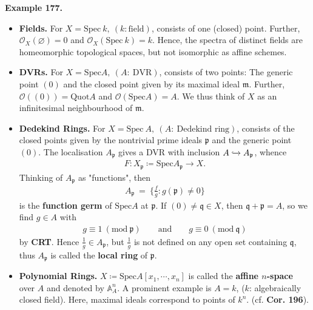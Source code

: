 \documentclass[12pt,a4paper,footinclude=true,headinclude=true]{scrbook} %
\newenvironment{example}[2][Example]
    { \begin{mdframed}[backgroundcolor=gray!20] \textbf{#1 #2.} }
    {  \end{mdframed}}
\begin{document}
\begin{example}{177}
    \begin{itemize}
        \item \textbf{Fields.} For $X=\mathrm{Spec}\ k,\ (k:\text{field})$, consists of one (closed) point. Further, $\mathcal{O}_X(\varnothing)=0$ and $\mathcal{O}_X(\mathrm{Spec}\ k)=k$. Hence, the spectra of distinct fields are homeomorphic topological spaces, but not isomorphic as affine schemes.
        \item \textbf{DVRs.} For $X=\mathrm{Spec}A,\ (A:\ \text{DVR})$, consists of two points: The generic point $(0)$ and the closed point given by its maximal ideal $\mathfrak{m}$. Further, $\mathcal{O}((0))=\mathrm{Quot}A$ and $\mathcal{O}(\mathrm{Spec}A)=A$. We thus think of $X$ as an infinitesimal neighbourhood of $\mathfrak{m}$.
        \item \textbf{Dedekind Rings.} For $X=\mathrm{Spec}\ A,\ (A:\ \text{Dedekind ring})$, consists of the closed points given by the nontrivial prime ideals $\mathfrak{p}$ and the generic point $(0)$. The localisation $A_\mathfrak{p}$ gives a DVR with inclusion $A\xhookrightarrow{} A_\mathfrak{p}$, whence 
        \begin{align*}
            F:X_\mathfrak{p}\coloneqq \mathrm{Spec}A_\mathfrak{p}\to X.    
        \end{align*}
        Thinking of $A_\mathfrak{p}$ as "functions", then 
        \begin{align*}
            A_\mathfrak{p}\ =\ \{\tfrac{f}{g}:g(\mathfrak{p})\neq0\}
        \end{align*}
        is the \textbf{function germ} of $\mathrm{Spec}A$ at $\mathfrak{p}$. If $(0)\neq\mathfrak{q}\in X$, then $\mathfrak{q}+\mathfrak{p}=A$, so we find $g\in A$ with 
        \begin{align*}
            g\equiv1\ (\mathrm{mod}\ \mathfrak{p})\qquad\text{and}\qquad
            g\equiv0\ (\mathrm{mod}\ \mathfrak{q})
        \end{align*}
        by \textbf{CRT}. Hence $\frac{1}{g}\in A_\mathfrak{p}$, but $\frac{1}{g}$ is not defined on any open set containing $\mathfrak{q}$, thus $A_\mathfrak{p}$ is called the \textbf{local ring} of $\mathfrak{p}$.
        \item \textbf{Polynomial Rings.} $X\coloneqq\mathrm{Spec}A[x_1,\cdots,x_n]$ is called the \textbf{affine $n$-space} over $A$ and denoted by $\mathbb{A}_A^n$. A prominent example is $A=k$, ($k$: algebraically closed field). Here, maximal ideals correspond to points of $k^n$. (cf. \textbf{Cor. 196}).
    \end{itemize}
\end{example}
\end{document}
